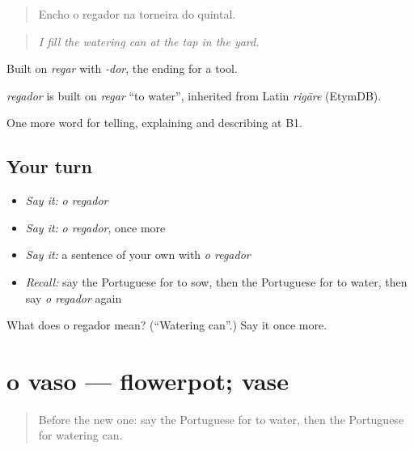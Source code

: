 \begin{quote}
Encho o regador na torneira do quintal.
\end{quote}

\begin{quote}
\emph{I fill the watering can at the tap in the yard.}
\end{quote}

Built on \emph{regar} with \emph{-dor}, the ending for a tool.

\begin{cousinweb}
\emph{regador} is built on \emph{regar} \textquotedblleft{}to water\textquotedblright{}, inherited from Latin \emph{rigāre} (EtymDB).
\end{cousinweb}

\begin{grammarlens}[title={What you've built}]
One more word for telling, explaining and describing at B1.
\end{grammarlens}

\subsection*{Your turn}
\begin{itemize}
\raggedright
  \item \emph{Say it:} \emph{o regador}
  \item \emph{Say it:} \emph{o regador}, once more
  \item \emph{Say it:} a sentence of your own with \emph{o regador}
  \item \emph{Recall:} say the Portuguese for to sow, then the Portuguese for to water, then say \emph{o regador} again
\end{itemize}

\begin{tcolorbox}[breakable,colback=teal!4,colframe=teal!35!black,title={Before you move on}]
What does o regador mean? (\textquotedblleft{}Watering can\textquotedblright{}.) Say it once more.
\end{tcolorbox}
\section[o vaso]{o vaso — flowerpot; vase}

\label{lesson:PT-C501-vaso}



\begin{quote}
Before the new one: say the Portuguese for to water, then the Portuguese for watering can.
\end{quote}

